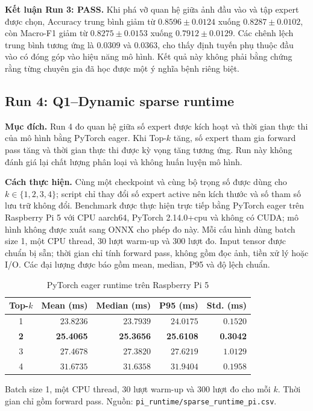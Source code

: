 \documentclass[conference]{IEEEtran}
\begin{document}
\textbf{Kết luận Run 3: PASS.} Khi phá vỡ quan hệ giữa ảnh đầu vào và tập
expert được chọn, Accuracy trung bình giảm từ $0.8596\pm0.0124$ xuống
$0.8287\pm0.0102$, còn Macro-F1 giảm từ $0.8275\pm0.0153$ xuống
$0.7912\pm0.0129$. Các chênh lệch trung bình tương ứng là $0.0309$ và
$0.0363$, cho thấy định tuyến phụ thuộc đầu vào có đóng góp vào hiệu năng mô
hình. Kết quả này không phải bằng chứng rằng từng chuyên gia đã học được một
ý nghĩa bệnh riêng biệt.

\subsection{Run 4: Q1--Dynamic sparse runtime}

\textbf{Mục đích.} Run 4 đo quan hệ giữa số expert được kích hoạt và thời gian
thực thi của mô hình bằng PyTorch eager. Khi Top-$k$ tăng, số expert tham gia
forward pass tăng và thời gian thực thi được kỳ vọng tăng tương ứng. Run này
không đánh giá lại chất lượng phân loại và không huấn luyện mô hình.

\textbf{Cách thực hiện.} Cùng một checkpoint và cùng bộ trọng số được dùng
cho $k\in\{1,2,3,4\}$; script chỉ thay đổi số expert active nên kích thước và
số tham số lưu trữ không đổi. Benchmark được thực hiện trực tiếp bằng
PyTorch eager trên Raspberry Pi 5 với CPU aarch64, PyTorch 2.14.0+cpu và
không có CUDA; mô hình không được xuất sang ONNX cho phép đo này. Mỗi cấu
hình dùng batch size 1, một CPU thread, 30 lượt warm-up và 300 lượt đo. Input
tensor được chuẩn bị sẵn; thời gian chỉ tính forward pass, không gồm đọc ảnh,
tiền xử lý hoặc I/O. Các đại lượng được báo gồm mean, median, P95 và độ lệch
chuẩn.

\begin{table}[H]
\caption{PyTorch eager runtime trên Raspberry Pi 5}
\label{tab:runtime}
\centering
\footnotesize
\begin{tabular}{@{}crrrr@{}}
\toprule
Top-$k$ & Mean (ms) & Median (ms) & P95 (ms) & Std. (ms) \\
\midrule
1 & $23.8236$ & $23.7939$ & $24.0175$ & $0.1520$ \\
\textbf{2} & \textbf{25.4065} & \textbf{25.3656} & \textbf{25.6108} & \textbf{0.3042} \\
3 & $27.4678$ & $27.3820$ & $27.6219$ & $1.0129$ \\
4 & $31.6735$ & $31.6358$ & $31.9404$ & $0.1958$ \\
\bottomrule
\end{tabular}
\vspace{2pt}

\raggedright\scriptsize Batch size 1, một CPU thread, 30 lượt warm-up và 300
lượt đo cho mỗi $k$. Thời gian chỉ gồm forward pass. Nguồn:
\texttt{pi\_runtime/sparse\_runtime\_pi.csv}.
\end{table}
\end{document}
